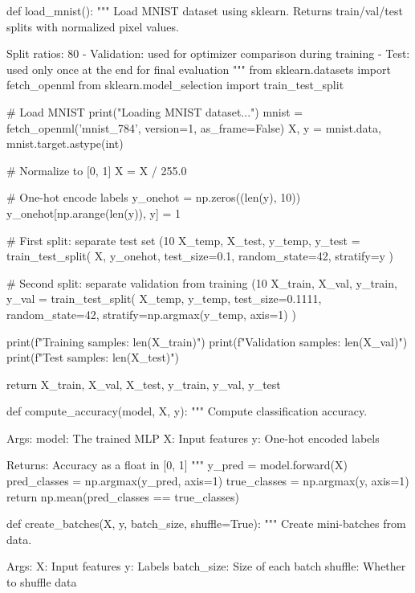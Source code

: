 \documentclass[../../main.tex]{subfiles}
\begin{document}
\begin{pythoncode}
def load_mnist():
    """
    Load MNIST dataset using sklearn.
    Returns train/val/test splits with normalized pixel values.

    Split ratios: 80%
    - Validation: used for optimizer comparison during training
    - Test: used only once at the end for final evaluation
    """
    from sklearn.datasets import fetch_openml
    from sklearn.model_selection import train_test_split

    # Load MNIST
    print("Loading MNIST dataset...")
    mnist = fetch_openml('mnist_784', version=1, as_frame=False)
    X, y = mnist.data, mnist.target.astype(int)

    # Normalize to [0, 1]
    X = X / 255.0

    # One-hot encode labels
    y_onehot = np.zeros((len(y), 10))
    y_onehot[np.arange(len(y)), y] = 1

    # First split: separate test set (10%
    X_temp, X_test, y_temp, y_test = train_test_split(
        X, y_onehot, test_size=0.1, random_state=42, stratify=y
    )

    # Second split: separate validation from training (10%
    X_train, X_val, y_train, y_val = train_test_split(
        X_temp, y_temp, test_size=0.1111, random_state=42,
        stratify=np.argmax(y_temp, axis=1)
    )

    print(f"Training samples: {len(X_train)}")
    print(f"Validation samples: {len(X_val)}")
    print(f"Test samples: {len(X_test)}")

    return X_train, X_val, X_test, y_train, y_val, y_test


def compute_accuracy(model, X, y):
    """
    Compute classification accuracy.

    Args:
        model: The trained MLP
        X: Input features
        y: One-hot encoded labels

    Returns:
        Accuracy as a float in [0, 1]
    """
    y_pred = model.forward(X)
    pred_classes = np.argmax(y_pred, axis=1)
    true_classes = np.argmax(y, axis=1)
    return np.mean(pred_classes == true_classes)


def create_batches(X, y, batch_size, shuffle=True):
    """
    Create mini-batches from data.

    Args:
        X: Input features
        y: Labels
        batch_size: Size of each batch
        shuffle: Whether to shuffle data


\end{pythoncode}
\end{document}
